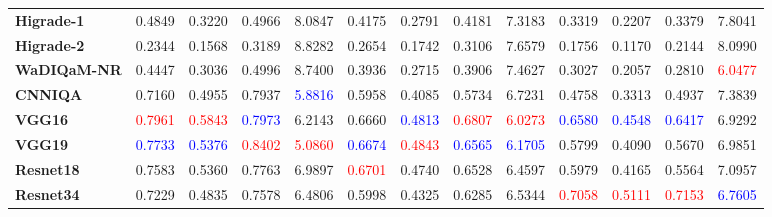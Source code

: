 \begin{table}
{\begin{tabular}{l||c|c|c|c|c|c|c|c|c|c|c|c}
\textbf{Higrade-1}\cite{kundu2017large} &0.4849 &0.3220&	0.4966&	8.0847 
&0.4175& 	0.2791& 	0.4181& 	7.3183 
&0.3319& 	0.2207& 	0.3379& 	7.8041  \\
\textbf{Higrade-2} \cite{kundu2017large}&0.2344 &	0.1568& 0.3189& 	8.8282 
&0.2654 &	0.1742 &	0.3106 &	7.6579 
&0.1756&0.1170 &	0.2144&8.0990  \\
\cmidrule(r){1-13}


\textbf{WaDIQaM-NR}\cite{bosse2017deep}& 0.4447 &	0.3036 &	0.4996 &	8.7400 
&0.3936 &	0.2715 &	0.3906 &	7.4627 
&0.3027 &0.2057 &	0.2810 &	\textcolor{red}{6.0477}
 \\
 \textbf{CNNIQA}\cite{kang2014convolutional} &0.7160 &0.4955 &0.7937 &\textcolor{blue}{5.8816}
&0.5958 &0.4085&0.5734 &6.7231  
&0.4758 &0.3313&	0.4937 &	7.3839   \\
 \textbf{VGG16}\cite{simonyan2014very} &\textcolor{red}{0.7961}  &\textcolor{red}{0.5843}  &	\textcolor{blue}{0.7973} &	6.2143  
&0.6660  &\textcolor{blue}{0.4813}  &\textcolor{red}{0.6807}  &\textcolor{red}{6.0273} 
&\textcolor{blue}{0.6580}  &\textcolor{blue}{0.4548}  &\textcolor{blue}{0.6417}  &6.9292    \\
 \textbf{VGG19}\cite{simonyan2014very} &\textcolor{blue}{0.7733}   &\textcolor{blue}{0.5376}   &	\textcolor{red}{0.8402}  &	\textcolor{red}{5.0860}   
&\textcolor{blue}{0.6674}  &\textcolor{red}{0.4843}   &\textcolor{blue}{0.6565}   &\textcolor{blue}{6.1705} 
&0.5799  &0.4090   &0.5670   &6.9851     \\
 \textbf{Resnet18}\cite{he2016deep} &0.7583    &0.5360    &	0.7763   &	6.9897    
&\textcolor{red}{0.6701}   &0.4740    &0.6528    &6.4597   
&0.5979  &0.4165  &0.5564   &7.0957     \\
 \textbf{Resnet34}\cite{he2016deep} &0.7229     &0.4835     &	0.7578    &	6.4806     
&0.5998    &0.4325     &0.6285     &6.5344    
&\textcolor{red}{0.7058}   &\textcolor{red}{0.5111}   &\textcolor{red}{0.7153}   &\textcolor{blue}{6.7605}      \\
    \bottomrule
  \end{tabular}
  }
\end{table}